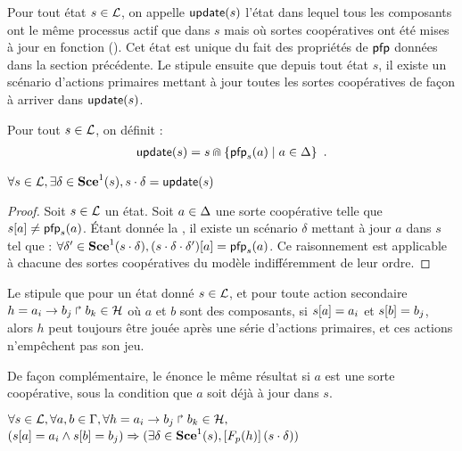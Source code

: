 Pour tout état $s \in \mathcal{L}$, on appelle $\mathsf{update}(s)$ l'état dans lequel tous les composants
ont le même processus actif que dans $s$
mais où sortes coopératives ont été mises à jour en fonction ().
Cet état est unique du fait des propriétés de $\mathsf{pfp}$ données dans la section précédente.
Le  stipule ensuite que depuis tout état $s$, il existe un scénario d'actions primaires
mettant à jour toutes les sortes coopératives de façon à arriver dans $\mathsf{update}(s)$.

\begin{definition}[$\update : \PHl \rightarrow \PHl$]
  Pour tout $s \in \mathcal{L}$, on définit :
  \begin{align*}
    \mathsf{update}(s) = s \Cap \{ \mathsf{pfp}_{s}(a) \mid a \in \Delta \} \enspace.
  \end{align*}
\end{definition}

\begin{lemma}
  $\forall s \in \mathcal{L}, \exists \delta \in \mathbf{Sce}^1(s), s \cdot \delta = \mathsf{update}(s)$
\end{lemma}

\begin{proof} %
  Soit $s \in \mathcal{L}$ un état.
  Soit $a \in \Delta$ une sorte coopérative telle que ${s[a]} \neq \mathsf{pfp}_s(a)$.
  Étant donnée la , il existe un scénario $\delta$ mettant à jour $a$
  dans $s$ tel que :
  $\forall \delta' \in \mathbf{Sce}^1(s \cdot \delta),
    {(s \cdot \delta \cdot \delta')[a]} = \mathsf{pfp}_s(a)$.
  Ce raisonnement est applicable à chacune des sortes coopératives du modèle
  indifféremment de leur ordre.
\end{proof}

Le  stipule que pour un état donné $s \in \mathcal{L}$, et pour toute action secondaire
$h = a_i\rightarrow b_j\Rsh b_k \in \mathcal{H}$ où $a$ et $b$ sont des composants,
si ${s[a]} = a_i$ et ${s[b]} = b_j$, alors
$h$ peut toujours être jouée après une série d'actions primaires,
et ces actions n'empêchent pas son jeu.

De façon complémentaire, le  énonce le même résultat si $a$ est une sorte coopérative,
sous la condition que $a$ soit déjà à jour dans $s$.

\begin{lemma}
  $\forall s \in \mathcal{L}, \forall a,b \in \Gamma, \forall h = a_i\rightarrow b_j\Rsh b_k \in \mathcal{H},$\\
  $({s[a]} = a_i \wedge {s[b]} = b_j) \Rightarrow
    (\exists \delta \in \mathbf{Sce}^1(s),
    \left[F_{p}(h)\right](s \cdot \delta))$
\end{lemma}

